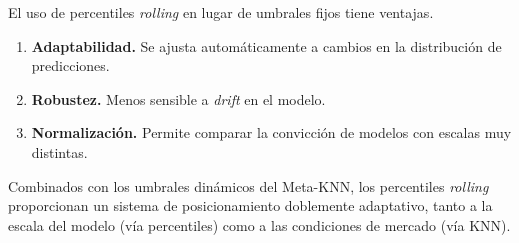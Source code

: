 El uso de percentiles \textit{rolling} en lugar de umbrales fijos tiene ventajas.

\begin{enumerate}
    \item \textbf{Adaptabilidad.} Se ajusta autom\'aticamente a cambios en la distribuci\'on de predicciones.
    \item \textbf{Robustez.} Menos sensible a \textit{drift} en el modelo.
    \item \textbf{Normalizaci\'on.} Permite comparar la convicci\'on de modelos con escalas muy distintas.
\end{enumerate}

Combinados con los umbrales din\'amicos del Meta-KNN, los percentiles \textit{rolling} proporcionan un sistema de posicionamiento doblemente adaptativo, tanto a la escala del modelo (v\'ia percentiles) como a las condiciones de mercado (v\'ia KNN).
